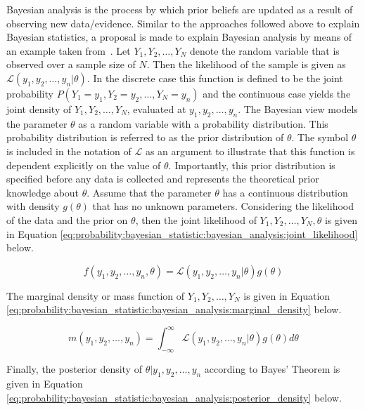Bayesian analysis is the process by which prior beliefs are updated as a result of observing new data/evidence. Similar to the approaches followed above to explain Bayesian statistics, a proposal is made to explain Bayesian analysis by means of an example taken from~\cite{ref:wackerly:2014}. Let $Y_{1}, Y_{2}, \dots, Y_{N}$ denote the random variable that is observed over a sample size of $N$. Then the likelihood of the sample is given as $\mathcal{L}(y_{1}, y_{2}, \dots, y_{n} \vert \theta)$. In the discrete case this function is defined to be the joint probability $P(Y_{1} = y_{1}, Y_{2} = y_{2}, \dots, Y_{N} = y_{n})$ and the continuous case yields the joint density of $Y_{1}, Y_{2}, \dots, Y_{N}$, evaluated at $y_{1}, y_{2}, \dots, y_{n}$. The Bayesian view models the parameter $\theta$ as a random variable with a probability distribution. This probability distribution is referred to as the prior distribution of $\theta$. The symbol $\theta$ is included in the notation of $\mathcal{L}$ as an argument to illustrate that this function is dependent explicitly on the value of $\theta$. Importantly, this prior distribution is specified before any data is collected and represents the theoretical prior knowledge about $\theta$. Assume that the parameter $\theta$ has a continuous distribution with density $g(\theta)$ that has no unknown parameters. Considering the likelihood of the data and the prior on $\theta$, then the joint likelihood of $Y_{1}, Y_{2}, \dots, Y_{N}, \theta$ is given in Equation \ref{eq:probability:bayesian_statistic:bayesian_analysis:joint_likelihood} below.

\begin{equation}
      \label{eq:probability:bayesian_statistic:bayesian_analysis:joint_likelihood}
      f(y_{1}, y_{2}, \dots, y_{n}, \theta) = \mathcal{L}(y_{1}, y_{2}, \dots, y_{n} \vert \theta)g(\theta)
\end{equation}

The marginal density or mass function of $Y_{1}, Y_{2}, \dots, Y_{N}$ is given in Equation \ref{eq:probability:bayesian_statistic:bayesian_analysis:marginal_density} below.

\begin{equation}
      \label{eq:probability:bayesian_statistic:bayesian_analysis:marginal_density}
      m(y_{1}, y_{2}, \dots, y_{n}) = \int_{-\infty}^{\infty} \mathcal{L}(y_{1}, y_{2}, \dots, y_{n} \vert \theta)g(\theta)d\theta
\end{equation}

Finally, the posterior density of $\theta \vert y_{1}, y_{2}, \dots, y_{n}$ according to Bayes' Theorem is given in Equation \ref{eq:probability:bayesian_statistic:bayesian_analysis:posterior_density} below.

